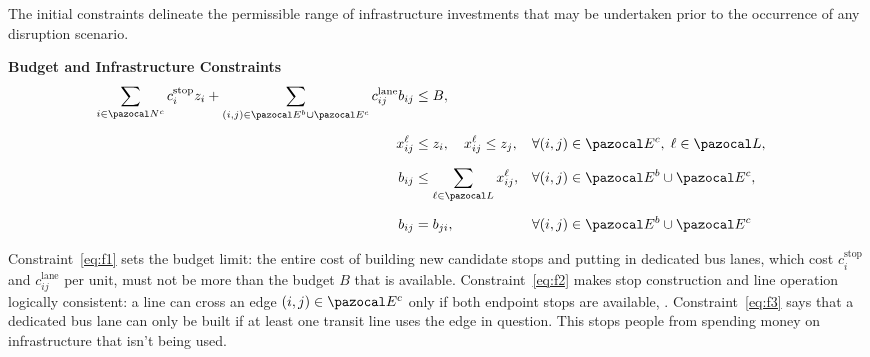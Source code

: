 \documentclass[3p,times,procedia]{elsarticle}
\begin{document}
The initial constraints delineate the permissible range of infrastructure investments that may be undertaken prior to the occurrence of any disruption scenario.

\textbf{Budget and Infrastructure Constraints}
\begin{align}
\sum_{i \in \pazocal N^c} c_i^{\text{stop}} z_i 
+ \sum_{(i,j) \in \pazocal E^b \cup \pazocal E^{c}} c_{ij}^{\text{lane}} b_{ij} 
&\leq B,
\label{eq:f1} \\[6pt]
x_{ij}^\ell &\leq z_i,
\quad
x_{ij}^\ell \leq z_j,
&& \forall (i,j) \in \pazocal E^c,\; \ell \in \pazocal L ,
\label{eq:f2} \\[6pt]
b_{ij} &\leq \sum_{\ell \in \pazocal L} x_{ij}^\ell, 
&& \forall (i,j) \in \pazocal E^b \cup \pazocal E^c ,
\label{eq:f3} \\[6pt]
b_{ij} &= b_{ji},
&& \forall (i,j) \in \pazocal E^b \cup \pazocal E^c
\label{eq:f4}
\end{align}

Constraint~\eqref{eq:f1} sets the budget limit: the entire cost of building new candidate stops and putting in dedicated bus lanes, which cost $c_i^{\text{stop}}$ and $c_{ij}^{\text{lane}}$ per unit, must not be more than the budget $B$ that is available.  
Constraint~\eqref{eq:f2} makes stop construction and line operation logically consistent: a line can cross an edge $(i,j) \in \pazocal E^c$ only if both endpoint stops are available, .
Constraint~\eqref{eq:f3} says that a dedicated bus lane can only be built if at least one transit line uses the edge in question. This stops people from spending money on infrastructure that isn't being used.
\end{document}
